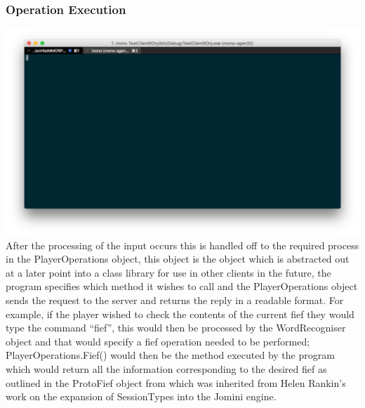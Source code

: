 \documentclass{article}
\begin{document}
\subsubsection{Operation Execution}
\includegraphics[width=\textwidth]{text2.png}
After the processing of the input occurs this is handled off to the required process in the PlayerOperations object, this object is the object which is abstracted out at a later point into a class library for use in other clients in the future, the program specifies which method it wishes to call and the PlayerOperations object sends the request to the server and returns the reply in a readable format. For example, if the player wished to check the contents of the current fief they would type the command “fief”, this would then be processed by the WordRecogniser object and that would specify a fief operation needed to be performed; PlayerOperations.Fief() would then be the method executed by the program which would return all the information corresponding to the desired fief as outlined in the ProtoFief object from which was inherited from Helen Rankin’s work on the expansion of SessionTypes into the Jomini engine.
\end{document}
